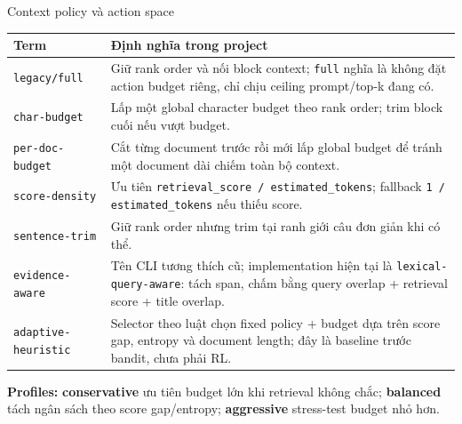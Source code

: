 \documentclass[aspectratio=169,10pt]{beamer}
\newcommand{\code}[1]{\texttt{\footnotesize #1}}
\newcommand{\minihead}[1]{{\bfseries\color{AccentDark}#1}}
\begin{document}
\begin{frame}{Context policy và action space}
  \scriptsize
  \renewcommand{\arraystretch}{1.12}
  \begin{tabular}{>{\raggedright\arraybackslash}p{}>{\raggedright\arraybackslash}p{}}
    \toprule
    Term & Định nghĩa trong project \\
    \midrule
    \code{legacy/full} & Giữ rank order và nối block context; \code{full} nghĩa là không đặt action budget riêng, chỉ chịu ceiling prompt/top-k đang có. \\
    \code{char-budget} & Lấp một global character budget theo rank order; trim block cuối nếu vượt budget. \\
    \code{per-doc-budget} & Cắt từng document trước rồi mới lấp global budget để tránh một document dài chiếm toàn bộ context. \\
    \code{score-density} & Ưu tiên \code{retrieval\_score / estimated\_tokens}; fallback \code{1 / estimated\_tokens} nếu thiếu score. \\
    \code{sentence-trim} & Giữ rank order nhưng trim tại ranh giới câu đơn giản khi có thể. \\
    \code{evidence-aware} & Tên CLI tương thích cũ; implementation hiện tại là \code{lexical-query-aware}: tách span, chấm bằng query overlap + retrieval score + title overlap. \\
    \code{adaptive-heuristic} & Selector theo luật chọn fixed policy + budget dựa trên score gap, entropy và document length; đây là baseline trước bandit, chưa phải RL. \\
    \bottomrule
  \end{tabular}

  \vspace{0.28cm}
  \footnotesize
  \minihead{Profiles:}
  \textbf{conservative} ưu tiên budget lớn khi retrieval không chắc;
  \textbf{balanced} tách ngân sách theo score gap/entropy;
  \textbf{aggressive} stress-test budget nhỏ hơn.
\end{frame}
\end{document}
